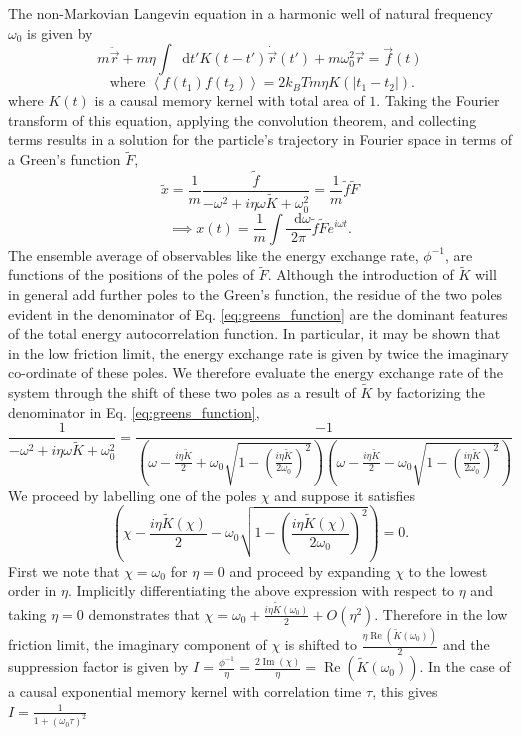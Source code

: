 \documentclass[7pt]{article}
\newcommand*{\diff}{\mathop{}\!\mathrm{d}}
\begin{document}
The non-Markovian Langevin equation in a harmonic well of natural frequency $\omega_0$ is given by
$$
	m\ddot{\vec{r}}+m\eta\int\diff{t'}K(t-t')\dot{\vec{r}}(t')+m\omega_0^2\vec{r}=\vec{f}(t)
$$
$$
	\text{ where } \left<f(t_1)f(t_2)\right>=2k_BTm\eta K(\left|t_1-t_2\right|).
$$
where $K(t)$ is a causal memory kernel with total area of $1$. Taking the Fourier transform of this equation, applying the convolution theorem, and collecting terms results in a solution for the particle's trajectory in Fourier space in terms of a Green's function $\tilde{F}$,
\begin{equation}\label{eq:greens_function}
	\tilde{x} = \frac{1}{m} \frac{\tilde{f}}{-\omega^2 + i \eta \omega \tilde{K} + \omega_0^2} = \frac{1}{m} \tilde{f} \tilde{F} 
\end{equation}
$$
\implies x(t) = \frac{1}{m}\int\frac{\diff{\omega}}{2\pi}\tilde{f} \tilde{F} e^{i\omega t}.
$$
The ensemble average of observables like the energy exchange rate, $\phi^{-1}$, are functions of the positions of the poles of $\tilde{F}$. Although the introduction of $\tilde{K}$ will in general add further poles to the Green's function, the residue of the two poles evident in the denominator of Eq. \ref{eq:greens_function} are the dominant features of the total energy autocorrelation function. In particular, it may be shown that in the low friction limit, the energy exchange rate is given by twice the imaginary co-ordinate of these poles. We therefore evaluate the energy exchange rate of the system through the shift of these two poles as a result of $\tilde{K}$ by factorizing the denominator in Eq. \ref{eq:greens_function},
$$
\frac{1}{-\omega^2 + i \eta \omega \tilde{K} + \omega_0^2} = \frac{-1}{\left(\omega - \frac{i\eta\tilde{K}}{2} + \omega_0\sqrt{1-\left(\frac{i\eta\tilde{K}}{2\omega_0}\right)^2}\right)\left(\omega - \frac{i\eta\tilde{K}}{2} - \omega_0\sqrt{1-\left(\frac{i\eta\tilde{K}}{2\omega_0}\right)^2}\right)}
$$
We proceed by labelling one of the poles $\chi$ and suppose it satisfies
$$
\left(\chi - \frac{i\eta\tilde{K}(\chi)}{2} - \omega_0\sqrt{1-\left(\frac{i\eta\tilde{K}(\chi)}{2\omega_0}\right)^2}\right)=0.
$$
First we note that $\chi=\omega_0$ for $\eta=0$ and proceed by expanding $\chi$ to the lowest order in $\eta$. Implicitly differentiating the above expression with respect to $\eta$ and taking $\eta=0$ demonstrates that $\chi = \omega_0 + \frac{i\eta\tilde{K}(\omega_0)}{2} + O(\eta^2)$. Therefore in the low friction limit, the imaginary component of $\chi$ is shifted to $\frac{\eta\operatorname{Re}(\tilde{K}(\omega_0))}{2}$ and the suppression factor is given by $I=\frac{\phi^{-1}}{\eta}=\frac{2\operatorname{Im}(\chi)}{\eta}=\operatorname{Re}(\tilde{K}(\omega_0))$. In the case of a causal exponential memory kernel with correlation time $\tau$, this gives $I=\frac{1}{1+(\omega_0\tau)^2}$ 
\end{document}
